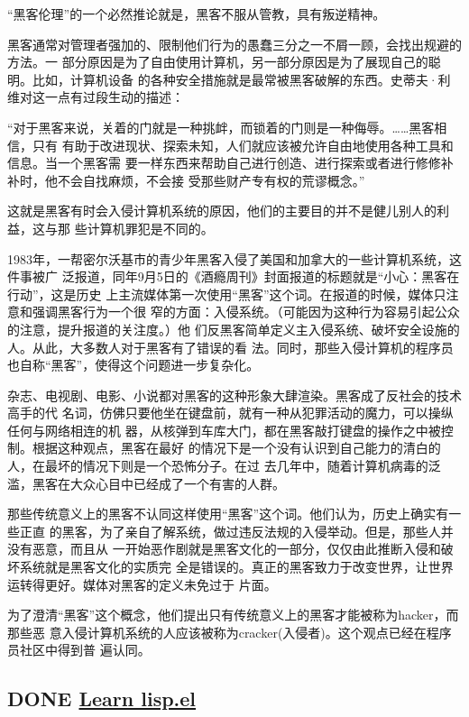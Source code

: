 \documentclass[11pt]{ctexart}
\begin{document}
{{{{“黑客伦理”的一个必然推论就是，黑客不服从管教，具有叛逆精神。

黑客通常对管理者强加的、限制他们行为的愚蠢三分之一不屑一顾，会找出规避的方法。一
部分原因是为了自由使用计算机，另一部分原因是为了展现自己的聪明。比如，计算机设备
的各种安全措施就是最常被黑客破解的东西。史蒂夫·利维对这一点有过段生动的描述：

“对于黑客来说，关着的门就是一种挑衅，而锁着的门则是一种侮辱。……黑客相信，只有
有助于改进现状、探索未知，人们就应该被允许自由地使用各种工具和信息。当一个黑客需
要一样东西来帮助自己进行创造、进行探索或者进行修修补补时，他不会自找麻烦，不会接
受那些财产专有权的荒谬概念。”

这就是黑客有时会入侵计算机系统的原因，他们的主要目的并不是健儿别人的利益，这与那
些计算机罪犯是不同的。

1983年，一帮密尔沃基市的青少年黑客入侵了美国和加拿大的一些计算机系统，这件事被广
泛报道，同年9月5日的《酒瘾周刊》封面报道的标题就是“小心：黑客在行动”，这是历史
上主流媒体第一次使用“黑客”这个词。在报道的时候，媒体只注意和强调黑客行为一个很
窄的方面：入侵系统。（可能因为这种行为容易引起公众的注意，提升报道的关注度。）他
们反黑客简单定义主入侵系统、破坏安全设施的人。从此，大多数人对于黑客有了错误的看
法。同时，那些入侵计算机的程序员也自称“黑客”，使得这个问题进一步复杂化。

杂志、电视剧、电影、小说都对黑客的这种形象大肆渲染。黑客成了反社会的技术高手的代
名词，仿佛只要他坐在键盘前，就有一种从犯罪活动的魔力，可以操纵任何与网络相连的机
器，从核弹到车库大门，都在黑客敲打键盘的操作之中被控制。根据这种观点，黑客在最好
的情况下是一个没有认识到自己能力的清白的人，在最坏的情况下则是一个恐怖分子。在过
去几年中，随着计算机病毒的泛滥，黑客在大众心目中已经成了一个有害的人群。

那些传统意义上的黑客不认同这样使用“黑客”这个词。他们认为，历史上确实有一些正直
的黑客，为了亲自了解系统，做过违反法规的入侵举动。但是，那些人并没有恶意，而且从
一开始恶作剧就是黑客文化的一部分，仅仅由此推断入侵和破坏系统就是黑客文化的实质完
全是错误的。真正的黑客致力于改变世界，让世界运转得更好。媒体对黑客的定义未免过于
片面。

为了澄清“黑客”这个概念，他们提出只有传统意义上的黑客才能被称为hacker，而那些恶
意入侵计算机系统的人应该被称为cracker(入侵者)。这个观点已经在程序员社区中得到普
遍认同。
\subsection{{\bfseries\sffamily DONE} \href{https://learnxinyminutes.com/docs/elisp/}{Learn lisp.el}}
\label{sec:org3e84b9d}
\lstset{language=Lisp,label= ,caption= ,captionpos=b,numbers=none}
\begin{lstlisting}


\end{lstlisting}}}}}
\end{document}
